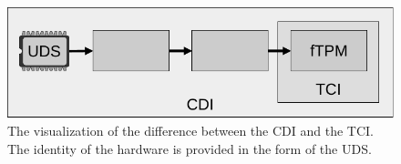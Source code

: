 \begin{figure}[htpb]
  \centering
  \includegraphics[width=0.6\linewidth]{figures/identities.pdf}
  \caption{The visualization of the difference between the CDI and the TCI. The identity of the hardware is provided in the form of the UDS.} \label{fig:identities}
\end{figure}

